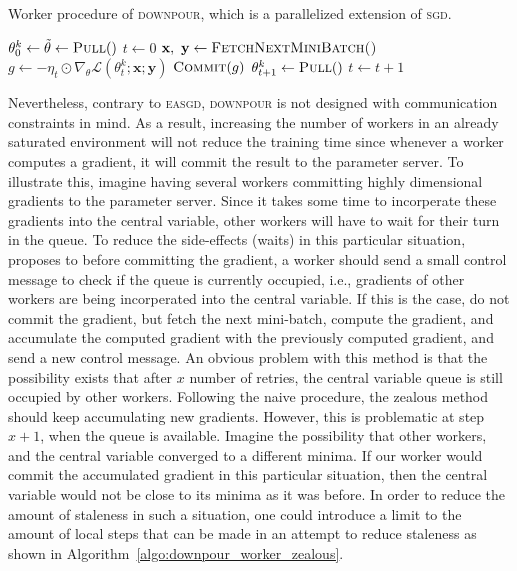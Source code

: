\begin{algorithm}[H]
  \caption{Worker procedure of \textsc{downpour}, which is a parallelized extension of \textsc{sgd}.}
  \label{algo:downpour_worker}
  \begin{algorithmic}[1]
    \State $\theta^k_0 \gets \tilde{\theta} \gets \Call{Pull}$
    \State $t \gets 0$
    \State $\textbf{x},~\textbf{y} \gets \Call{FetchNextMiniBatch()}{}$
    \State $g \gets -\eta_t \odot \nabla_\theta \mathcal{L}(\theta^k_t;\textbf{x};\textbf{y})$
    \State $\Call{Commit}{g}$
    \State $\theta^k_{t + 1} \gets \Call{Pull}$
    \State $t \gets t + 1$
    \EndWhile
    \EndProcedure
  \end{algorithmic}
\end{algorithm}

Nevertheless, contrary to \textsc{easgd}, \textsc{downpour} is not designed with communication constraints in mind. As a result, increasing the number of workers in an already saturated environment will not reduce the training time since whenever a worker computes a gradient, it will commit the result to the parameter server. To illustrate this, imagine having several workers committing highly dimensional gradients to the parameter server. Since it takes some time to incorperate these gradients into the central variable, other workers will have to wait for their turn in the queue. To reduce the side-effects (waits) in this particular situation,~\cite{louppe2010zealous} proposes to before committing the gradient, a worker should send a small control message to check if the queue is currently occupied, i.e., gradients of other workers are being incorperated into the central variable. If this is the case, do not commit the gradient, but fetch the next mini-batch, compute the gradient, and accumulate the computed gradient with the previously computed gradient, and send a new control message. An obvious problem with this method is that the possibility exists that after $x$ number of retries, the central variable queue is still occupied by other workers. Following the naive procedure, the zealous method should keep accumulating new gradients. However, this is problematic at step $x + 1$, when the queue is available. Imagine the possibility that other workers, and the central variable converged to a different minima. If our worker would commit the accumulated gradient in this particular situation, then the central variable would not be close to its minima as it was before. In order to reduce the amount of staleness in such a situation, one could introduce a limit to the amount of local steps that can be made in an attempt to reduce staleness as shown in Algorithm~\ref{algo:downpour_worker_zealous}.\\


